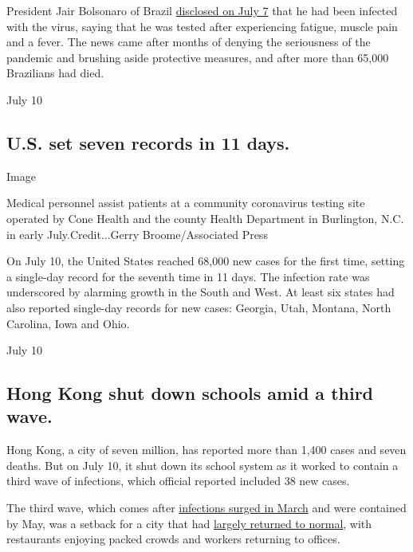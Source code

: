 President Jair Bolsonaro of Brazil
\href{https://www.nytimes3xbfgragh.onion/2020/07/07/world/americas/brazil-bolsonaro-coronavirus.html?action=click\&module=RelatedLinks\&pgtype=Article}{disclosed
on July 7} that he had been infected with the virus, saying that he was
tested after experiencing fatigue, muscle pain and a fever. The news
came after months of denying the seriousness of the pandemic and
brushing aside protective measures, and after more than 65,000
Brazilians had died.

July 10

\hypertarget{us-set-seven-records-in-11-days}{%
\subsection{U.S. set seven records in 11
days.}\label{us-set-seven-records-in-11-days}}

Image

Medical personnel assist patients at a community coronavirus testing
site operated by Cone Health and the county Health Department in
Burlington, N.C. in early July.Credit...Gerry Broome/Associated Press

On July 10, the United States reached 68,000 new cases for the first
time, setting a single-day record for the seventh time in 11 days. The
infection rate was underscored by alarming growth in the South and West.
At least six states had also reported single-day records for new cases:
Georgia, Utah, Montana, North Carolina, Iowa and Ohio.

July 10

\hypertarget{hong-kong-shut-down-schools-amid-a-third-wave}{%
\subsection{Hong Kong shut down schools amid a third
wave.}\label{hong-kong-shut-down-schools-amid-a-third-wave}}

Hong Kong, a city of seven million, has reported more than 1,400 cases
and seven deaths. But on July 10, it shut down its school system as it
worked to contain a third wave of infections, which official reported
included 38 new cases.

The third wave, which comes after
\href{https://www.nytimes3xbfgragh.onion/2020/03/31/world/asia/coronavirus-china-hong-kong-singapore-south-korea.html}{infections
surged in March} and were contained by May, was a setback for a city
that had
\href{https://www.nytimes3xbfgragh.onion/2020/05/19/world/asia/coronavirus-hong-kong.html}{largely
returned to normal}, with restaurants enjoying packed crowds and workers
returning to offices.

